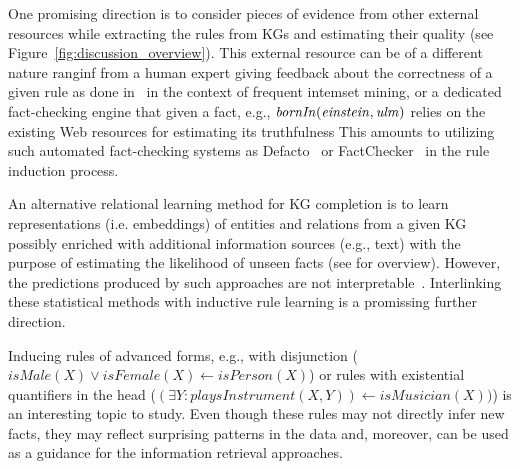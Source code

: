 One promising direction is to consider pieces of evidence from other external resources while extracting the rules from KGs and estimating their quality %
(see Figure~\ref{fig:discussion_overview}). This external resource can be of a different nature ranginf from %
a human expert giving feedback about the correctness of %
a given rule %
as done in~\cite{Dzyuba2017} in the context of frequent intemset mining, %
or a dedicated fact-checking engine that given a fact, e.g., $\mathit{bornIn(einstein,ulm)}$ relies on the existing Web resources for estimating its truthfulness %
This amounts to utilizing such automated fact-checking systems as Defacto~\cite{defacto} or FactChecker~\cite{factchecker} in the rule induction process. %

 An alternative relational learning method for KG completion is to learn representations (i.e. embeddings) of entities and relations from a given KG possibly enriched with additional information sources (e.g., text) with the %
purpose of estimating the likelihood of unseen facts  %
(see \cite{Wang2017} for overview). However, %
the
predictions produced by such approaches are not interpretable~\cite{Shakerin2018}. %
Interlinking these statistical methods with inductive rule learning is a promissing further direction.

Inducing rules of  advanced forms, e.g., %
with disjunction (\eg $isMale(X) \vee isFemale(X) \leftarrow isPerson(X)$) or rules with existential quantifiers in the head (\eg $(\exists Y: playsInstrument(X, Y)) \leftarrow isMusician(X))$) is an interesting topic to study. %
Even though these rules may not directly infer new facts, they may reflect surprising patterns in the data and, moreover,  can be used as a guidance for the information retrieval approaches.


